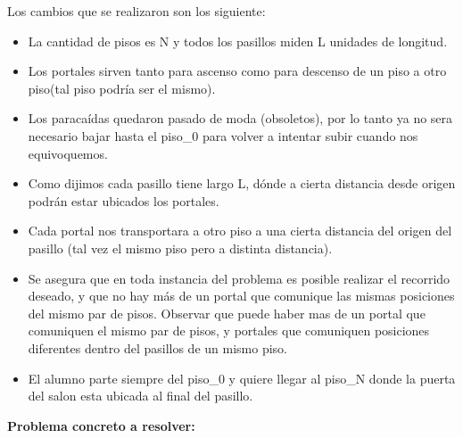 Los cambios que se realizaron son los siguiente: \newline
\begin{itemize}
	\item La cantidad de pisos es N y todos los pasillos miden L unidades de longitud.
	\item Los portales sirven tanto para ascenso como para descenso de un piso a otro piso(tal piso podría ser el mismo).
	\item Los paracaídas quedaron pasado de moda (obsoletos), por lo tanto ya no sera necesario bajar hasta el piso_0  para volver a intentar subir cuando nos equivoquemos.
	\item Como dijimos cada pasillo tiene largo L, dónde a cierta distancia desde origen podrán estar ubicados los portales.
	\item Cada portal nos transportara a otro piso a una cierta distancia del origen del pasillo (tal vez el mismo piso pero a distinta distancia).
	\item Se asegura que en toda instancia del problema es posible realizar el recorrido deseado, y que no hay más de un portal que comunique las mismas posiciones del mismo par de pisos. Observar que puede haber mas de un portal que comuniquen el mismo par de pisos, y portales que comuniquen posiciones diferentes dentro del pasillos de un mismo piso.
	\item El alumno parte siempre del piso_0 y quiere llegar al piso_N donde la puerta del salon esta ubicada al final del pasillo. 
\end{itemize}


 
\textbf{Problema concreto a resolver:} \newline

